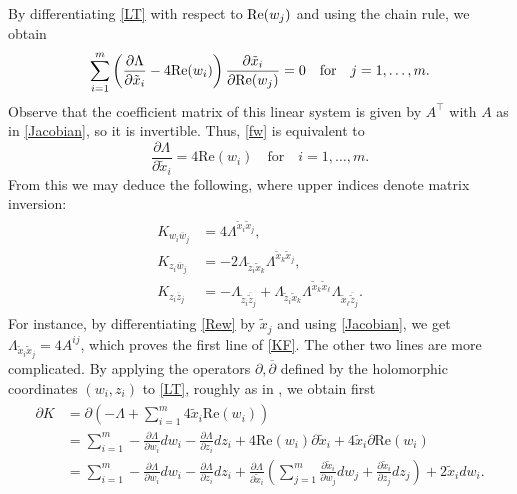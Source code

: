 \documentclass[11pt,reqno]{amsart}
\theoremstyle{plain}
\theoremstyle{definition}
\numberwithin{equation}{section}
\begin{document}
By differentiating \eqref{LT} with respect to ${\rm Re}(w_{j})$ and using the chain rule, we obtain
\begin{equation}\label{fw}\sum_{i=1}^{m}\left(\frac{\partial \Lambda}{\partial \tilde{x}_{i}}-4\mathrm{Re}(w_{i})\right)\frac{\partial \tilde{x}_{i}}{\partial {\rm Re}(w_{j})}=0  \quad \mbox{for} \quad j=1,\ldots,m.\end{equation}
Observe that the coefficient matrix of this linear system is given by $A^\top$ with $A$ as in \eqref{Jacobian}, so it is invertible.
 Thus, \eqref{fw} is equivalent to
\begin{equation}\label{Rew}\frac{\partial \Lambda}{\partial \tilde{x}_{i}}=4\mathrm{Re}(w_{i}) \quad \text{for}  \quad i = 1, \ldots, m.\end{equation}
From this we may deduce the following, where upper indices denote matrix inversion:
\begin{align}\begin{split}\label{KF}
   K_{w_{i}\overline{w}_{j}}  & =  4\Lambda^{\tilde{x}_{i}\tilde{x}_{j}}, \\
   K_{z_{i}\overline{w}_{j}}  & =  -2\Lambda_{\tilde{z}_i \tilde{x}_k}\Lambda^{\tilde{x}_{k}\tilde{x}_{j}},\\
   K_{z_{i}\overline{z}_{j}}  & =  -\Lambda_{\tilde{z}_{i}\overline{\tilde{z}}_{j}}+\Lambda_{\tilde{z}_{i}\tilde{x}_{k}}\Lambda^{\tilde{x}_{k}\tilde{x}_{\ell}}\Lambda_{\tilde{x}_{\ell}\overline{\tilde{z}}_{j}}.
\end{split}\end{align}
For instance, by differentiating \eqref{Rew} by $\tilde{x}_j$ and using \eqref{Jacobian}, we get $\Lambda_{\tilde{x}_i \tilde{x}_j} = 4A^{ij}$, which proves the first line of \eqref{KF}. The other two lines are more complicated. By applying the operators $\partial,\overline{\partial}$ defined by the holomorphic coordinates $(w_i,z_i)$ to \eqref{LT}, roughly as in \cite[Eq. 3.142]{HKLR}, we obtain first
\begin{align*}\begin{split}
   \partial K  & =  \displaystyle \partial\left(-\Lambda+\sum_{i=1}^{m} 4\tilde{x}_{i}\mbox{Re}(w_{i}) \right) \\
   & =  \displaystyle \sum_{i=1}^{m}-\frac{\partial \Lambda}{\partial w_{i}}dw_{i}-\frac{\partial \Lambda}{\partial z_{i}}dz_{i}+4\mbox{Re}(w_{i})\partial\tilde{x}_{i}+4\tilde{x}_{i}\partial\mbox{Re}(w_{i})\\
&= \displaystyle \sum_{i=1}^{m} -\frac{\partial \Lambda}{\partial w_{i}}dw_{i}-\frac{\partial \Lambda}{\partial z_{i}}dz_{i}+\frac{\partial \Lambda}{\partial \tilde{x}_i}\left( \sum_{j=1}^{m} \frac{\partial \tilde{x}_{i}}{\partial w_{j}}dw_{j}+\frac{\partial \tilde{x}_i}{\partial z_j}dz_j\right)+2\tilde{x}_{i}dw_{i}.
\end{split}\end{align*}
\end{document}
